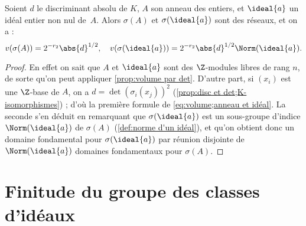 \documentclass[11pt, %
  title in boldface,
  theorem in new line,
  theorem numbering = section,
  number theorems separately,
  simple name,
]{beaulivre}
\begin{document}
    \begin{proposition}\label{prop:volume;anneau et idéal}
        Soient \( d \) le discriminant absolu de \( K \), \( A \) son anneau des entiers, et \( \ideal{a} \) un idéal entier non nul de~\( A \). Alors \( \sigma(A) \) et \( \sigma(\ideal{a}) \) sont des réseaux, et on a :
        \begin{equation}\label{eq:volume;anneau et idéal}
            v(\sigma(A)) = 2^{-r_2} \abs{d}^{1/2}, \quad
            v(\sigma(\ideal{a})) = 2^{-r_2} \abs{d}^{1/2} \Norm(\ideal{a}).
        \end{equation}
    \end{proposition}
    \begin{proof}
        En effet on sait que \( A \) et \( \ideal{a} \) sont des \( \Z \)‑modules libres de rang \( n \), de sorte qu'on peut appliquer \cref{prop:volume par det}. D'autre part, si \( (x_i) \) est une \( \Z \)‑base de \( A \), on a \( d = \det(\sigma_i(x_j))^2 \) (\cref{prop:disc et det;K-isomorphismes}) ; d'où la première formule de \eqref{eq:volume;anneau et idéal}. La seconde s'en déduit en remarquant que \( \sigma(\ideal{a}) \) est un sous-groupe d'indice \( \Norm(\ideal{a}) \) de \( \sigma(A) \) (\cref{def:norme d'un idéal}), et qu'on obtient donc un domaine fondamental pour \( \sigma(\ideal{a}) \) par réunion disjointe de \( \Norm(\ideal{a}) \) domaines fondamentaux pour \( \sigma(A) \).
    \end{proof}

\section{Finitude du groupe des classes d'idéaux}\label{sec:finitude du groupe des classes d'idéaux}
\end{document}
